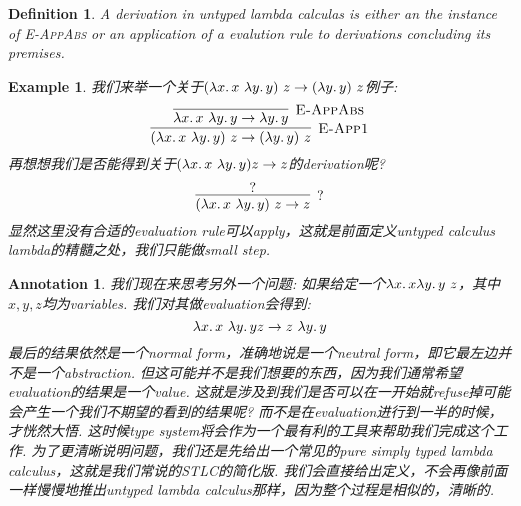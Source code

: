 \documentclass{article}
\newtheorem{example}[theorem]{Example}
\newtheorem{definition}[theorem]{Definition}
\newtheorem{annotation}[theorem]{Annotation}
\newcommand{\lam}[2]{\ensuremath{\lambda #1\ldotp #2}} %
\begin{document}
\begin{definition}
\rm A \emph{derivation} in untyped lambda calculas is either an the instance of \textsc{E-AppAbs} or an application of a evalution rule to derivations concluding its premises. 
\end{definition}

\begin{example}
\rm 我们来举一个关于$(\lam{x}{x}~\lam{y}{y})~z \to (\lam{y}{y})~z$例子:
\[
	\infer[\textsc{E-App1}]{(\lam{x}{x}~\lam{y}{y})~z \to (\lam{y}{y})~z}{\infer[\textsc{E-AppAbs}]{\lam{x}{x}~\lam{y}{y} \to \lam{y}{y}}{}}
\] 
再想想我们是否能得到关于$(\lam{x}{x}~\lam{y}{y}) z \to z$的derivation呢?
\[
	\infer[?]{(\lam{x}{x}~\lam{y}{y})~z \to z}{?}
\]
显然这里没有合适的evaluation rule可以apply，这就是前面定义untyped calculus lambda的精髓之处，我们只能做small step. 
\end{example}

\begin{annotation}
\rm 我们现在来思考另外一个问题: 如果给定一个$\lam{x}{x \lam{y}{y}}~z$，其中$x,y,z$均为variables. 我们对其做evaluation会得到:
\[
	\lam{x}{x~\lam{y}{y}} z \to z~\lam{y}{y} 
\]
最后的结果依然是一个normal form，准确地说是一个neutral form，即它最左边并不是一个abstraction. 但这可能并不是我们想要的东西，因为我们通常希望evaluation的结果是一个value. 这就是涉及到我们是否可以在一开始就refuse掉可能会产生一个我们不期望的看到的结果呢? 而不是在evaluation进行到一半的时候，才恍然大悟. 这时候type system将会作为一个最有利的工具来帮助我们完成这个工作. 为了更清晰说明问题，我们还是先给出一个常见的\emph{pure simply typed lambda calculus}，这就是我们常说的STLC的简化版. 我们会直接给出定义，不会再像前面一样慢慢地推出untyped lambda calculus那样，因为整个过程是相似的，清晰的.  
\end{annotation}
\end{document}
